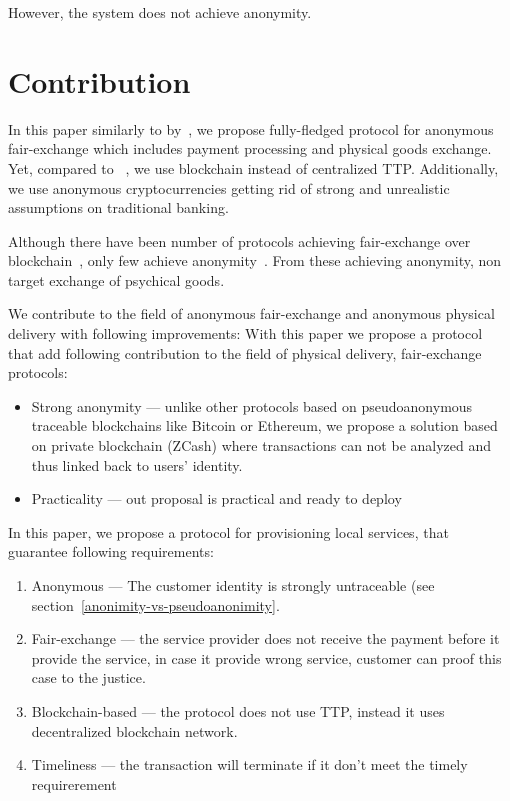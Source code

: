 \documentclass{article}
\begin{document}
However, the system does not achieve anonymity.


\section{Contribution}
In this paper similarly to by~\cite{birjoveanu2015anonymity}, we propose fully-fledged protocol for anonymous fair-exchange which includes payment processing and physical goods exchange. Yet, compared to ~\cite{birjoveanu2015anonymity}, we use blockchain instead of centralized TTP. Additionally, we use anonymous cryptocurrencies getting rid of strong and unrealistic assumptions on traditional banking.

Although there have been number of protocols achieving fair-exchange over blockchain~\cite{heilman2016blindly, meng2019themis, icete18, barber2012bitter}, only few achieve anonymity~\cite{heilman2016blindly}. From these achieving anonymity, non target exchange of psychical goods.

We contribute to the field of anonymous fair-exchange and anonymous physical delivery with following improvements:
With this paper we propose a protocol that add following contribution to the field of physical delivery, fair-exchange protocols:
\begin{itemize}
    \item Strong anonymity — unlike other protocols based on pseudoanonymous traceable blockchains like Bitcoin or Ethereum, we propose a solution based on private blockchain (ZCash) where transactions can not be analyzed and thus linked back to users' identity.
    \item Practicality — out proposal is practical and ready to deploy
\end{itemize}

In this paper, we propose a protocol for provisioning local services, that guarantee following requirements:
\begin{enumerate}
    \item Anonymous — The customer identity is strongly untraceable (see section~\ref{anonimity-vs-pseudoanonimity}.
    \item Fair-exchange — the service provider does not receive the payment before it provide the service, in case it provide wrong service, customer can proof this case to the justice.
    \item Blockchain-based — the protocol does not use TTP, instead it uses decentralized blockchain network.
    \item Timeliness — the transaction will terminate if it don't meet the timely requirerement
\end{enumerate}
\end{document}
